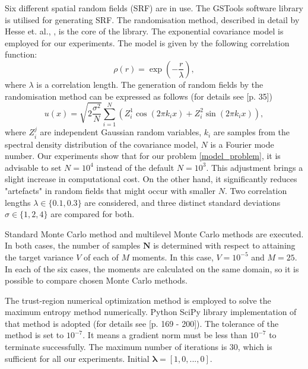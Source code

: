 \documentclass{article}
\def\vc#1{\mathbf{\boldsymbol{#1}}}     %
\def\vl{{\vc\lambda}}
\begin{document}
Six different spatial random fields (SRF) are in use. The GSTools software library \cite{GSTools} is utilised for generating SRF. The randomisation method, described in detail by Hesse et. al., \cite{Hesse2014}, is the core of the library. The exponential covariance model is employed for our experiments. The model is given by the following correlation function:
$$
\rho(r) = \exp\left(-\frac{r}{\lambda}\right),
$$
where $\lambda$ is a correlation length. The generation of random fields by the randomisation method can be expressed as follows (for details see  \cite{Hesse2014}[p. 35])
$$
u(x) = \sqrt{2 \frac{\sigma^2}{N}} \sum_{i=1}^{N}{\left( Z_i^1\cos(2\pi k_i x) + Z_i^2\sin(2\pi k_i x)   \right)},
$$
where $Z_i^j$ are independent Gaussian random variables, $k_i$ are samples from the spectral density distribution of the covariance model, $N$ is a Fourier mode number.
Our experiments show that for our problem \ref{model_problem}, it is advisable to set $N=10^4$ instead of the default $N=10^3$. This adjustment brings a slight increase in computational cost. On the other hand, it significantly reduces "artefacts" in random fields that might occur with smaller $N$. %
Two correlation lengths $\lambda \in \{0.1, 0.3\}$ are considered, and three distinct standard deviations $\sigma \in \{1, 2, 4\}$ are compared for both.

Standard Monte Carlo method and multilevel Monte Carlo methods are executed. In both cases, the number of samples $\vc N$ is determined with respect to attaining the target variance $V$ of each of $M$ moments. In this case, $V=10^{-5}$ and $M=25$. In each of the six cases, the moments are calculated on the same domain, so it is possible to compare chosen Monte Carlo methods.

The trust-region numerical optimization method is employed to solve the maximum entropy method numerically. %
Python SciPy library implementation of that method is adopted (for details see  \cite{Conn20000125}[p. 169 - 200]). The tolerance of the method is set to $10^{-7}$. It means a gradient norm must be less than $10^{-7}$ to terminate successfully. The maximum number of iterations is 30, which is sufficient for all our experiments. Initial $\vl = [1, 0, ..., 0]$. 



\end{document}
